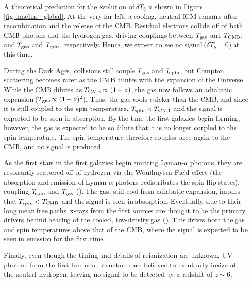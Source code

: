 A theoretical prediction for the evolution of $\delta T_{b}$ is shown in Figure \ref{fig:timeline_global}. At the very far left, a cooling, neutral IGM remains after recombination and the release of the CMB. Residual electrons collide off of both CMB photons and the hydrogen gas, driving couplings between $T_{\rm gas}$ and $T_{\rm CMB}$, and $T_{\rm gas}$ and $T_{\rm spin}$, respectively. Hence, we expect to see no signal ($\delta T_{b} = 0$) at this time.

During the Dark Ages, collisions still couple $T_{\rm gas}$ and $T_{\rm spin}$, but Compton scattering becomes rarer as the CMB dilutes with the expansion of the Universe. While the CMB dilutes as $T_{\rm CMB} \propto (1+z)$, the gas now follows an adiabatic expansion ($T_{\rm gas} \propto (1+z)^{2}$). Thus, the gas cools quicker than the CMB, and since it is still coupled to the spin temperature, $T_{\rm spin} < T_{\rm CMB}$ and the signal is expected to be seen in absorption. By the time the first galaxies begin forming, however, the gas is expected to be so dilute that it is no longer coupled to the spin temperature. The spin temperature therefore couples once again to the CMB, and no signal is produced.

As the first stars in the first galaxies begin emitting Lyman-$\alpha$ photons, they are resonantly scattered off of hydrogen via the Wouthuysen-Field effect (the absorption and emission of Lyman-$\alpha$ photons redistributes the spin-flip states), coupling $T_{\rm spin}$ and $T_{\rm gas}$ (\citealt{pritchard_and_loeb2010}). The gas, still cool from adiabatic expansion, implies that $T_{\rm spin} < T_{\rm CMB}$ and the signal is seen in absorption. Eventually, due to their long mean free paths, x-rays from the first sources are thought to be the primary drivers behind heating of the cooled, low-density gas (\citealt{furlanetto_et_al2006}). This drives both the gas and spin temperatures above that of the CMB, where the signal is expected to be seen in emission for the first time. 

Finally, even though the timing and details of reionization are unknown, UV photons from the first luminous structures are believed to eventually ionize all the neutral hydrogen, leaving no signal to be detected by a redshift of $z \sim 6$. 

